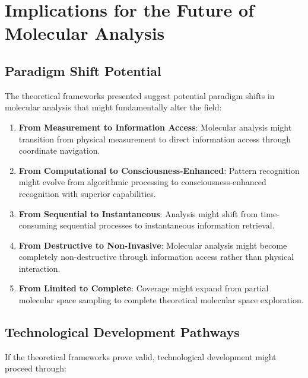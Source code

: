 \documentclass[11pt,a4paper]{article}
\theoremstyle{remark}
\begin{document}
{{{{{{{{{{\section{Implications for the Future of Molecular Analysis}

\subsection{Paradigm Shift Potential}

The theoretical frameworks presented suggest potential paradigm shifts in molecular analysis that might fundamentally alter the field:

\begin{enumerate}
\item \textbf{From Measurement to Information Access}: Molecular analysis might transition from physical measurement to direct information access through coordinate navigation.

\item \textbf{From Computational to Consciousness-Enhanced}: Pattern recognition might evolve from algorithmic processing to consciousness-enhanced recognition with superior capabilities.

\item \textbf{From Sequential to Instantaneous}: Analysis might shift from time-consuming sequential processes to instantaneous information retrieval.

\item \textbf{From Destructive to Non-Invasive}: Molecular analysis might become completely non-destructive through information access rather than physical interaction.

\item \textbf{From Limited to Complete}: Coverage might expand from partial molecular space sampling to complete theoretical molecular space exploration.
\end{enumerate}

\subsection{Technological Development Pathways}

If the theoretical frameworks prove valid, technological development might proceed through:

}}}}}}}}}}
\end{document}
